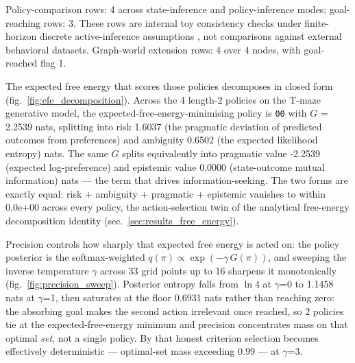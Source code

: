 \documentclass[
  english,
]{article}
\begin{document}
Policy-comparison rows: 4 across state-inference and policy-inference
modes; goal-reaching rows: 3. These rows are internal toy consistency
checks under finite-horizon discrete active-inference assumptions
\citep{friston2021sophisticated, dacosta2023reward}, not comparisons
against external behavioral datasets. Graph-world extension rows: 4 over
4 nodes, with goal-reached flag 1.

The expected free energy that scores those policies decomposes in closed
form (fig.~\ref{fig:efe_decomposition}). Across the 4 length-2 policies
on the T-maze generative model, the expected-free-energy-minimising
policy is \texttt{00} with \(G\) = 2.2539 nats, splitting into risk
1.6037 (the pragmatic deviation of predicted outcomes from preferences)
and ambiguity 0.6502 (the expected likelihood entropy) nats. The same
\(G\) splits equivalently into pragmatic value -2.2539 (expected
log-preference) and epistemic value 0.0000 (state-outcome mutual
information) nats --- the term that drives information-seeking. The two
forms are exactly equal: risk + ambiguity + pragmatic + epistemic
vanishes to within 0.0e+00 across every policy, the action-selection
twin of the analytical free-energy decomposition identity
(sec.~\ref{sec:results_free_energy}).

Precision controls how sharply that expected free energy is acted on:
the policy posterior is the softmax-weighted
\(q(\pi) \propto \exp(-\gamma\,G(\pi))\), and sweeping the inverse
temperature \(\gamma\) across 33 grid points up to 16 sharpens it
monotonically (fig.~\ref{fig:precision_sweep}). Posterior entropy falls
from \(\ln 4\) at \(\gamma\)=0 to 1.1458 nats at \(\gamma\)=1, then
saturates at the floor 0.6931 nats rather than reaching zero: the
absorbing goal makes the second action irrelevant once reached, so 2
policies tie at the expected-free-energy minimum and precision
concentrates mass on that optimal \emph{set}, not a single policy. By
that honest criterion selection becomes effectively deterministic ---
optimal-set mass exceeding 0.99 --- at \(\gamma\)=3.
\end{document}
